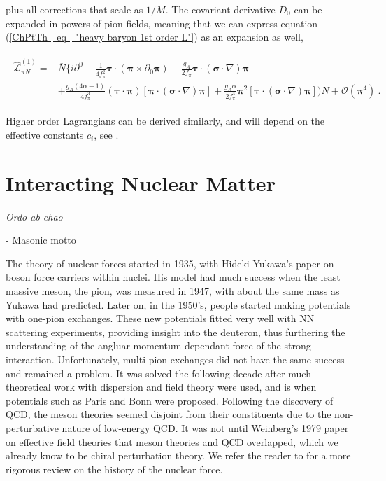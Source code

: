 \documentclass[10pt,twoside]{report}
\begin{document}
	\noindent plus all corrections that scale as $1/M$. The covariant derivative $D_0$ can be expanded in powers of pion fields, meaning that we can express equation (\ref{ChPtTh | eq | "heavy baryon 1st order L"}) as an expansion as well, \cite{MachleidtEntem11}
	
	\begin{align}
		\begin{split}
		\widehat{\mathcal{L}}_{\pi N}^{(1)} = &\overbar{N}\Big\{ i\partial^0 -\frac{1}{4f_\pi^2}\bm{\tau}\cdot(\bm{\pi}\times\partial_0\bm{\pi}) - \frac{g_A}{2f_\pi}\bm{\tau}\cdot(\bm{\sigma}\cdot\nabla)\bm{\pi}\\
		&+ \frac{g_A(4\alpha-1)}{4f_\pi^3}(\bm{\tau}\cdot\bm{\pi})\left[\bm{\pi}\cdot(\bm{\sigma}\cdot\nabla)\bm{\pi}\right] + \frac{g_A\alpha}{2f_\pi^3}\bm{\pi}^2\left[\bm{\tau}\cdot(\bm{\sigma}\cdot\nabla)\bm{\pi}\right] \Big)N + \mathcal{O}(\bm{\pi}^4) \:.
		\end{split}
	\end{align}
	
	Higher order Lagrangians can be derived similarly, and will depend on the effective constants $c_i$, see \cite{MachleidtEntem11}.
	
	
	\newpage
	\chapter{Interacting Nuclear Matter}
	\label{Int.Nucl.Mat.}
	\epigraph{\textit{Ordo ab chao}}{- Masonic motto}
	
	The theory of nuclear forces started in 1935, with Hideki Yukawa's paper \cite{Yukawa35} on boson force carriers within nuclei. His model had much success when the least massive meson, the pion, was measured in 1947, with about the same mass as Yukawa had predicted. Later on, in the 1950's, people started making potentials with one-pion exchanges. These new potentials fitted very well with NN scattering experiments, providing insight into the deuteron, thus furthering the understanding of the angluar momentum dependant force of the strong interaction.  Unfortunately, multi-pion exchanges did not have the same success and remained a problem. It was solved the following decade after much theoretical work with dispersion and field theory were used, and is when potentials such as Paris and Bonn were proposed. Following the discovery of QCD, the meson theories seemed disjoint from their constituents due to the non-perturbative nature of low-energy QCD. It was not until Weinberg's 1979 paper \cite{Weinberg79} on effective field theories that meson theories and QCD overlapped, which we already know to be chiral perturbation theory. We refer the reader to \cite{MachleidtEntem11} for a more rigorous review on the history of the nuclear force.\\
	
\end{document}
